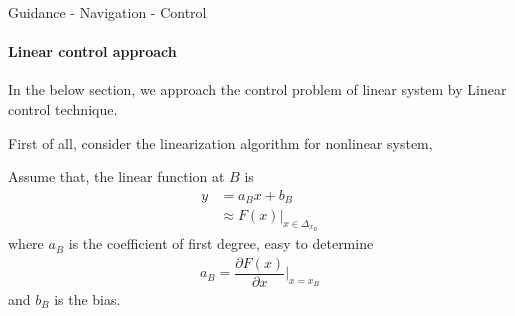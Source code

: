 \begin{frame}{Guidance - Navigation - Control}
	\framesubtitle{Linear control approach}
	In the below section, we approach the control problem of linear system by Linear control technique.
	
	First of all, consider the linearization algorithm for nonlinear system, 
	
	\vspace{1cm}
	
	\begin{minipage}{.5\textwidth}
		\hspace{0cm}
		Assume that, the linear function at $B$ is
		\begin{align}
			y &= a_Bx + b_B \\
			&\approx F(x) \Big|_{x \in \Delta_{x_B}}
		\end{align}
		where $a_B$ is the coefficient of first degree, easy to determine
		\begin{align}
			a_B = \dfrac{\partial F(x)}{\partial x}\Bigg|_{x = x_B}
		\end{align}
		and $b_B$ is the bias.
	\end{minipage}%
	\begin{minipage}{.5\textwidth}
		\hspace{+0.25cm}
		\centering
	\end{minipage}
\end{frame}



